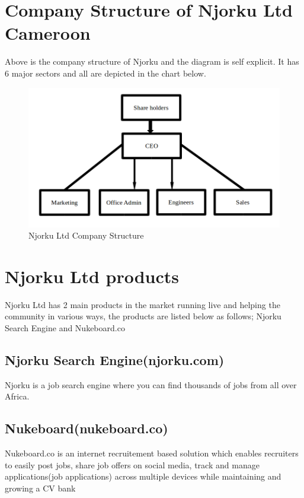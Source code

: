 \section{Company Structure of Njorku Ltd Cameroon}

Above is the company structure of Njorku and the diagram is self explicit. It has 6 major sectors and all are depicted in the chart below. \\

\begin{figure}[h]
\centering
\includegraphics[width=13cm,scale=1.5]{Figures/CompanyStructure}
\decoRule
\caption[Company Structure]{Njorku Ltd Company Structure}
\label{fig:CompanyStructure}
\end{figure}

\section{Njorku Ltd products}

Njorku Ltd has 2 main products in the market running live and helping the community in various ways, the products are listed below as follows; Njorku Search Engine and Nukeboard.co

\subsection{Njorku Search Engine(njorku.com)}

Njorku is a job search engine where you can find thousands of jobs from all over Africa.

\subsection{Nukeboard(nukeboard.co)}

Nukeboard.co is an internet recruitement based solution which enables recruiters to easily post jobs, share job offers on social media, track and manage applications(job applications) across multiple devices while maintaining and growing a CV bank

